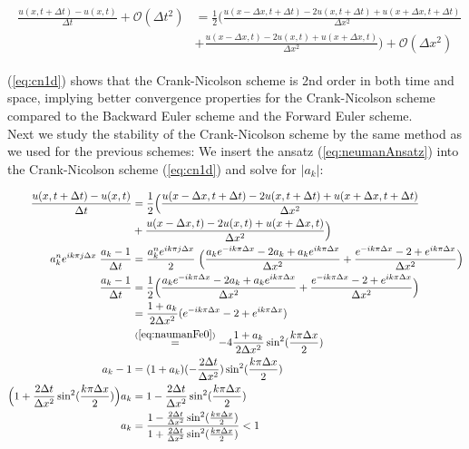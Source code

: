 \documentclass{article}
\begin{document}
\begin{subequations}\label{eq:cn1d}
	\begin{align}
		\begin{split}
			\frac{u(x,t+\Delta t) - u(x,t)}{\Delta t} + \mathcal{O}(\Delta t^2)
			&= \frac{1}{2} \Big(\frac{u(x-\Delta x,t+ \Delta t)
			- 2u(x,t+\Delta t) +u(x+\Delta x,t+\Delta t)}{\Delta x^2} \\
			&+ \frac{u(x-\Delta x,t) - 2u(x,t) +u(x+ \Delta x,t)}{\Delta x^2} \Big) + \mathcal{O}(\Delta x^2)
		\end{split}
	\end{align}
\end{subequations}

(\ref{eq:cn1d}) shows that the Crank-Nicolson scheme is 2nd order in both time and space, implying better convergence properties for the Crank-Nicolson scheme compared to the Backward Euler scheme and the Forward Euler scheme.\\

Next we study the stability of the Crank-Nicolson scheme by the same method as we used for the previous schemes: We insert the ansatz (\ref{eq:neumanAnsatz}) into the Crank-Nicolson scheme (\ref{eq:cn1d}) and solve for $|a_k|$:

\begin{subequations}
	\begin{align}
		\begin{split}
			\frac{u(x,t+\Delta t) - u(x,t)}{\Delta t} 
			&= \frac{1}{2} \Big(\frac{u(x-\Delta x,t+ \Delta t)
			- 2u(x,t+\Delta t) +u(x+\Delta x,t+\Delta t)}{\Delta x^2} \\
			&+ \frac{u(x-\Delta x,t) - 2u(x,t) +u(x+ \Delta x,t)}{\Delta x^2} \Big) \\
			a_k^n e^{i k \pi j \Delta x}\; \frac{ a_k  - 1}{\Delta t} &= \frac{a_k^n e^{i k \pi j \Delta x}}{2}\; \Big(\frac{a_k e^{-i k \pi \Delta x} - 2a_k + a_k e^{i k \pi \Delta x}}{\Delta x^2} + \frac{e^{-i k \pi \Delta x} - 2 +  e^{i k \pi \Delta x}}{\Delta x^2} \Big)\\
			\frac{ a_k  - 1}{\Delta t}&=\frac{1}{2}\Big(\frac{a_k e^{-i k \pi \Delta x} - 2a_k + a_k e^{i k \pi \Delta x}}{\Delta x^2} + \frac{e^{-i k \pi \Delta x} - 2 +  e^{i k \pi \Delta x}}{\Delta x^2} \Big)\\
			&= \frac{1+a_k}{2\Delta x^2} (e^{-i k \pi \Delta x} - 2 + e^{i k \pi \Delta x})\\
			&\stackrel{(\ref{eq:naumanFe0})}{=} -4\frac{1+a_k}{2\Delta x^2} \sin^2(\frac{k\pi \Delta x}{2})\\
			a_k -1 &= (1 + a_k) (-\frac{2 \Delta t}{\Delta x^2})\sin^2(\frac{k\pi \Delta x}{2})\\
			\Big(1 +\frac{2 \Delta t}{\Delta x^2}\sin^2(\frac{k\pi \Delta x}{2})\Big)a_k &= 1 - \frac{2 \Delta t}{\Delta x^2}\sin^2(\frac{k\pi \Delta x}{2})\\
			a_k &= \frac{1 - \frac{2 \Delta t}{\Delta x^2}\sin^2(\frac{k\pi \Delta x}{2})}{1 +\frac{2 \Delta t}{\Delta x^2}\sin^2(\frac{k\pi \Delta x}{2})} < 1\label{eq:neumanCn1d}
		\end{split}
	\end{align}
\end{subequations}
\end{document}
